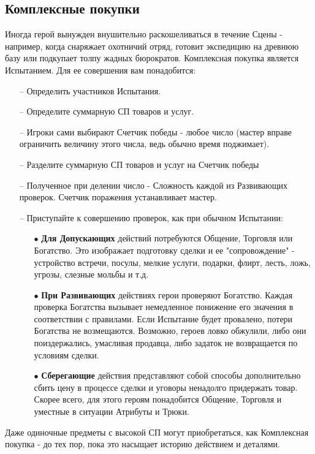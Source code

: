 \subsection{Комплексные покупки}
Иногда герой вынужден внушительно раскошеливаться в течение Сцены - например, когда снаряжает охотничий отряд, готовит экспедицию на древнюю базу или подкупает толпу жадных бюрократов. 
\newline Комплексная покупка является Испытанием. Для ее совершения вам понадобится:
\begin{itemize}
    \item[--] Определить участников Испытания.
    \item[--] Определите суммарную СП товаров и услуг.
    \item[--] Игроки сами выбирают Счетчик победы - любое число (мастер вправе ограничить величину этого числа, ведь обычно время поджимает).
    \item[--] Разделите суммарную СП товаров и услуг на Счетчик победы
    \item[--] Полученное при делении число - Сложность каждой из Развивающих проверок. Счетчик поражения устанавливает мастер.
    \item[--] Приступайте к совершению проверок, как при обычном Испытании:
        \begin{itemize}
            \item[$\bullet$] \textbf{Для Допускающих} действий потребуются Общение, Торговля или Богатство. Это изображает подготовку сделки и ее "сопровождение" - устройство встречи, посулы, мелкие услуги, подарки, флирт, лесть, ложь, угрозы, слезные мольбы и т.д.
            \item[$\bullet$] \textbf{При Развивающих} действиях герои проверяют Богатство. Каждая проверка Богатства вызывает немедленное понижение его значения в соответствии с правилами. Если Испытание будет провалено, потери Богатства не возмещаются. Возможно, героев ловко обжулили, либо они поиздержались, умасливая продавца, либо задаток не возвращается по условиям сделки.
            \item[$\bullet$] \textbf{Сберегающие} действия представляют собой способы дополнительно сбить цену в процессе сделки и уговоры ненадолго придержать товар. Скорее всего, для этого героям понадобится Общение, Торговля и уместные в ситуации Атрибуты и Трюки.
        \end{itemize}
\end{itemize}

\begin{tcolorbox}
    Даже одиночные предметы с высокой СП могут приобретаться, как Комплексная покупка - до тех пор, пока это насыщает историю действием и деталями.
\end{tcolorbox}

